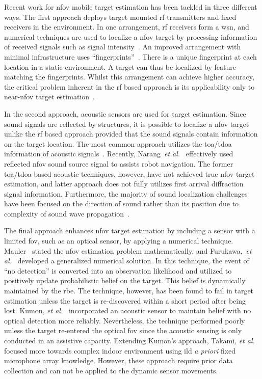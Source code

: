 \documentclass[letterpaper, 10 pt, conference]{ieeeconf}  %
\begin{document}
Recent work for \acrfull{nfov} mobile target estimation has been tackled in three different ways. The first approach deploys target mounted \gls{rf} transmitters and fixed receivers in the environment.  In one arrangement, \gls{rf} receivers form a \gls{wsn}, and numerical techniques are used to localize a \gls{nfov} target by processing information of received signals such as signal intensity~\cite{Dai2012,Guvenc2009}. An improved arrangement with minimal infrastructure uses ``fingerprints''~\cite{Bahl2000,lad04}. There is a unique fingerprint at each location in a static environment.  A target can thus be localized by feature-matching the fingerprints.  Whilst this arrangement can achieve higher accuracy, the critical problem inherent in the \gls{rf} based approach is its applicability only to near-\gls{nfov} target estimation~\cite{priyantha2005mobile,Seow2008}. 

In the second approach, acoustic sensors are used for target estimation.  Since sound signals are reflected by structures, it is possible to localize a \gls{nfov} target unlike the \gls{rf} based approach provided that the sound signals contain information on the target location. The most common approach utilizes the \acrfull{toa}/\gls{tdoa} information of acoustic signals~\cite{hu2011simultaneous,ward2003particle,Mak2009}. Recently, Narang~{\it et al.}~\cite{narang2014auditory} effectively used reflected \gls{nfov} sound source signal to assists robot navigation.  The former \gls{toa}/\gls{tdoa} based acoustic techniques, however, have not achieved true \gls{nfov} target estimation, and latter approach does not fully utilizes first arrival diffraction signal information. Furthermore, the majority of sound localization challenges have been focused on the direction of sound rather than its position due to complexity of sound wave propagation~\cite{tamai2005three,sva12}.  

The final approach enhances \gls{nfov} target estimation by including a sensor with a limited \gls{fov}, such as an optical sensor, by applying a numerical technique. Mauler~\cite{mau03} stated the \gls{nfov} estimation problem mathematically, and Furukawa,~{\it et al.}~\cite{fur06,fur12} developed a generalized numerical solution.  In this technique, the event of ``no detection'' is converted into an observation likelihood and utilized to positively update probabilistic belief on the target. This belief is dynamically maintained by the \gls{rbe}.  The technique, however, has been found to fail in target estimation unless the target is re-discovered within a short period after being lost.  Kumon, {\it et al.}~\cite{kum13}  incorporated an acoustic sensor to maintain belief with no optical detection more reliably. Nevertheless, the technique performed poorly unless the target re-entered the optical \gls{fov} since the acoustic sensing is only conducted in an assistive capacity. Extending Kumon's approach, Takami, {\it et al.}~\cite{takami2015fsr} focused more towards complex indoor environment using \gls{ild} {\it a priori} fixed microphone array knowledge. However, these approach require prior data collection and can not be applied to the dynamic sensor movements.   
\end{document}

